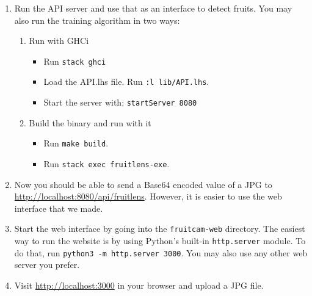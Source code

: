 \begin{enumerate}
  \item Run the API server and use that as an interface to detect fruits. You may also run the training algorithm in two ways: 
  \begin{enumerate}
      \item Run with GHCi
        \begin{itemize}
            \item Run \verb |stack ghci|
            \item Load the API.lhs file. Run \verb|:l lib/API.lhs|.
            \item Start the server with: \verb|startServer 8080|
        \end{itemize}
      \item Build the binary and run with it
        \begin{itemize}
            \item Run \verb|make build|.
            \item Run \verb|stack exec fruitlens-exe|.
        \end{itemize}
  \end{enumerate}
    \item Now you should be able to send a Base64 encoded value of a JPG to \url{http://localhost:8080/api/fruitlens}. However, it is easier to use the web interface that we made.
    \item Start the web interface by going into the \texttt{fruitcam-web} directory. The easiest way to run the website is by using Python's built-in \texttt{http.server} module. To do that, run \verb|python3 -m http.server 3000|. You may also use any other web server you prefer. 
    \item Visit \url{http://localhost:3000} in your browser and upload a JPG file.
\end{enumerate}
